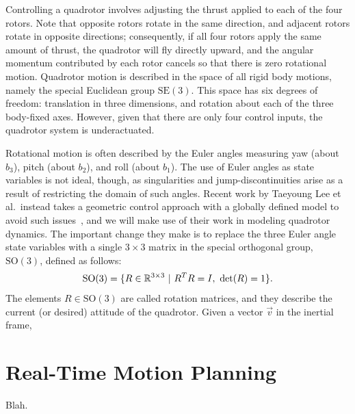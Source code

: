 Controlling a quadrotor involves adjusting the thrust applied to each of the four rotors. Note that opposite rotors rotate in the same direction, and adjacent rotors rotate in opposite directions; consequently, if all four rotors apply the same amount of thrust, the quadrotor will fly directly upward, and the angular momentum contributed by each rotor cancels so that there is zero rotational motion. Quadrotor motion is described in the space of all rigid body motions, namely the special Euclidean group $\text{SE}(3)$. This space has six degrees of freedom: translation in three dimensions, and rotation about each of the three body-fixed axes. However, given that there are only four control inputs, the quadrotor system is underactuated.

Rotational motion is often described by the Euler angles measuring yaw (about $b_3$), pitch (about $b_2$), and roll (about $b_1$). The use of Euler angles as state variables is not ideal, though, as singularities and jump-discontinuities arise as a result of restricting the domain of such angles. Recent work by Taeyoung Lee et al.\ instead takes a geometric control approach with a globally defined model to avoid such issues~\cite{Lee2010}, and we will make use of their work in modeling quadrotor dynamics. The important change they make is to replace the three Euler angle state variables with a single $3 \times 3$ matrix in the special orthogonal group, $\text{SO}(3)$, defined as follows:
\begin{equation}
    \text{SO}(3) = \{ R \in \mathbb{R}^{3 \times 3} \ \vert \ R^T R = I,\ \det(R) = 1 \}.
\end{equation}
The elements $R \in \text{SO}(3)$ are called rotation matrices, and they describe the current (or desired) attitude of the quadrotor. Given a vector $\vec{v}$ in the inertial frame,  



\section{Real-Time Motion Planning}\label{chap:quad:rtmp}

Blah.